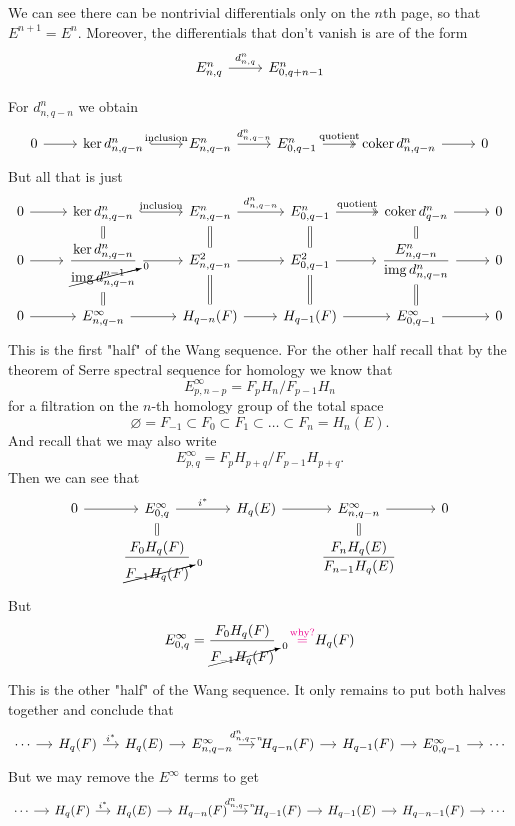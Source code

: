 We can see there can be nontrivial differentials only on the $n$th page, so that $E^{n+1}=E^n$. Moreover, the differentials that don't vanish is are of the form
\[\begin{tikzcd}
E^n_{n,q}\arrow[r,"d^n_{n,q}"]&E^n_{0,q+n-1}
\end{tikzcd}\]

For $d_{n,q-n}^n$ we obtain
\[\begin{tikzcd}
	0\arrow[r]&\operatorname{ker} d^n_{n,q-n}\arrow[r,"\text{inclusion} ",hook]&E^n_{n,q-n}\arrow[r,"d^n_{n,q-n}"]&E^n_{0,q-1}\arrow[r,"\text{quotient}",two heads]&\operatorname{coker}d^n_{n,q-n}\arrow[r]&0
\end{tikzcd}\]
But all that is just
\[\begin{tikzcd}[row sep=small]
	0\arrow[r]&\operatorname{ker} d^n_{n,q-n}\arrow[r,"\text{inclusion} ",hook]\arrow[d,equals]&E^n_{n,q-n}\arrow[r,"d^n_{n,q-n}"]\arrow[d,equals]&E^n_{0,q-1}\arrow[r,"\text{quotient}",two heads]\arrow[d,equals]&\operatorname{coker}d^n_{q-n}\arrow[r]\arrow[d,equals]&0\\
	0\arrow[r]&\dfrac{\operatorname{ker} d^n_{n,q-n}}{\cancelto{0}{\operatorname{img} d^{n-1}_{n,q-n}}}\arrow[r]\arrow[d,equals]&E^2_{n,q-n}\arrow[r]\arrow[d,equals]&E^2_{0,q-1}\arrow[r]\arrow[d,equals]&\dfrac{E^n_{n,q-n}}{\operatorname{img} d^n_{n,q-n}} \arrow[d,equals]\arrow[r]&0\\
	0\arrow[r]&E^\infty_{n,q-n}\arrow[r]&H_{q-n}(F)\arrow[r]&H_{q-1}(F)\arrow[r]&E^{\infty}_{0,q-1}\arrow[r]&0
\end{tikzcd}\]
This is the first "half" of the Wang sequence. For the other half recall that by the theorem of Serre spectral sequence for homology we know that
\[E^{\infty}_{p,n-p}=F_pH_n/F_{p-1}H_n\]
for a filtration on the $n$-th homology group of the total space 
\[\varnothing=F_{-1}\subset F_0 \subset F_1\subset \ldots\subset F_n=H_{n}(E).\]
And recall that we may also write
\[E^\infty_{p,q}=F_pH_{p+q}/F_{p-1}H_{p+q}.\]
Then we can see that
\[\begin{tikzcd}[row sep=small]
	0\arrow[r]&E^\infty_{0,q}\arrow[d,equal]\arrow[r,"i^*"]&H_{q}(E)\arrow[r]&E^\infty_{n,q-n}\arrow[r]\arrow[d,equal]&0\\
		  &\dfrac{F_0H_{q}(F)}{\cancelto{0}{F_{-1}H_{q}(F)}} &&\dfrac{F_nH_{q}(E)}{F_{n-1}H_{q}(E)}
\end{tikzcd}\]
But 
\[E^\infty_{0,q}=\dfrac{F_0H_{q}(F)}{\cancelto{0}{F_{-1}H_{q}(F)}}{\color{magenta}\quad \overset{\text{why?}}{=}}H_{q}(F)\]

This is the other "half" of the Wang sequence. It only remains to put both halves together and conclude that
\[\begin{tikzcd}[column sep=small]
	\cdots\arrow[r]&H_{q}(F)\arrow[r,"i^*"]&H_{q}(E)\arrow[r]&E^{\infty}_{n,q-n}\arrow[r,"d^n_{n,q-n}"]&H_{q-n}(F)\arrow[r]&H_{q-1}(F)\arrow[r]&E^\infty_{0,q-1}\arrow[r]&\cdots
\end{tikzcd}\]
But we may remove the $E^\infty$ terms to get
\[\begin{tikzcd}[column sep=small]
	\cdots\arrow[r]&H_{q}(F)\arrow[r,"i^*"]&H_{q}(E)\arrow[r]&H_{q-n}(F)\arrow[r,"d^n_{n,q-n}"]&H_{q-1}(F)\arrow[r]&H_{q-1}(E)\arrow[r]&H_{q-n-1}(F)\arrow[r]&\cdots
\end{tikzcd}\]


